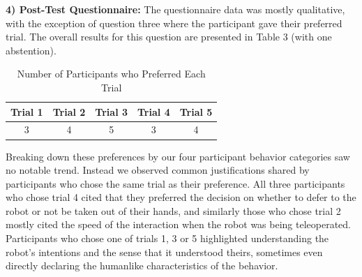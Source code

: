 \documentclass[letterpaper, 10 pt, conference]{ieeeconf}  %
\begin{document}
\textbf{4) Post-Test Questionnaire:} The questionnaire data was mostly qualitative, with the exception of question three where the participant gave their preferred trial. The overall results for this question are presented in Table 3 (with one abstention).


\begin{table}[ht]
\caption{Number of Participants who Preferred Each Trial }
\label{Preferences}
\begin{center}
\begin{tabular}{|c|c|c|c|c|}
\hline
Trial 1 & Trial 2 & Trial 3 & Trial 4 & Trial 5 \\
\hline
3 & 4 & 5 & 3 & 4 \\
\hline
\end{tabular}
\end{center}
\end{table}


Breaking down these preferences by our four participant behavior categories saw no notable trend. Instead we observed common justifications shared by participants who chose the same trial as their preference. All three participants who chose trial 4 cited that they preferred the decision on whether to defer to the robot or not be taken out of their hands, and similarly those who chose trial 2 mostly cited the speed of the interaction when the robot was being teleoperated. Participants who chose one of trials 1, 3 or 5 highlighted understanding the robot's intentions and the sense that it understood theirs, sometimes even directly declaring the humanlike characteristics of the behavior.

\end{document}
